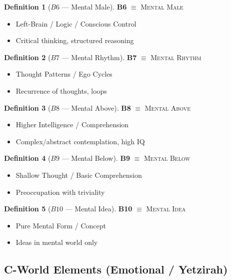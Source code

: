 \documentclass[11pt,twoside,openright]{book}
\theoremstyle{definition}
\newtheorem{definition}{Definition}[chapter]
\theoremstyle{plain}
\theoremstyle{remark}
\begin{document}
\begin{definition}[$B6$ --- Mental Male]
\label{def:B6}
\textbf{B6} $\equiv$ \textsc{Mental Male}
\begin{itemize}
  \item Left-Brain / Logic / Conscious Control
  \item Critical thinking, structured reasoning
\end{itemize}
\end{definition}

\begin{definition}[$B7$ --- Mental Rhythm]
\label{def:B7}
\textbf{B7} $\equiv$ \textsc{Mental Rhythm}
\begin{itemize}
  \item Thought Patterns / Ego Cycles
  \item Recurrence of thoughts, loops
\end{itemize}
\end{definition}

\begin{definition}[$B8$ --- Mental Above]
\label{def:B8}
\textbf{B8} $\equiv$ \textsc{Mental Above}
\begin{itemize}
  \item Higher Intelligence / Comprehension
  \item Complex/abstract contemplation, high IQ
\end{itemize}
\end{definition}

\begin{definition}[$B9$ --- Mental Below]
\label{def:B9}
\textbf{B9} $\equiv$ \textsc{Mental Below}
\begin{itemize}
  \item Shallow Thought / Basic Comprehension
  \item Preoccupation with triviality
\end{itemize}
\end{definition}

\begin{definition}[$B10$ --- Mental Idea]
\label{def:B10}
\textbf{B10} $\equiv$ \textsc{Mental Idea}
\begin{itemize}
  \item Pure Mental Form / Concept
  \item Ideas in mental world only
\end{itemize}
\end{definition}

\subsection{C-World Elements (Emotional / Yetzirah)}
\end{document}
